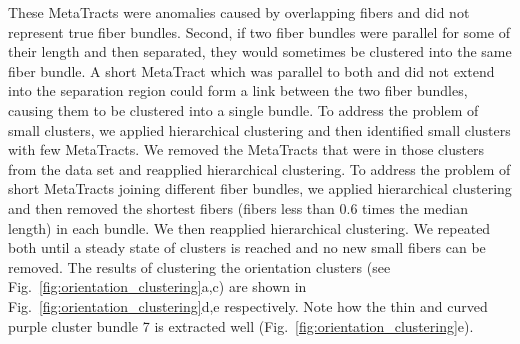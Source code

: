 These MetaTracts were anomalies caused by overlapping fibers and did not represent true fiber bundles.
Second, if two fiber bundles were parallel for some of their length and then separated, they would sometimes be clustered into the same fiber bundle.
A short MetaTract which was parallel to both and did not extend into the separation region could form a link between the two fiber bundles, causing them to be clustered into a single bundle.
To address the problem of small clusters, we applied hierarchical clustering and then identified small clusters with few MetaTracts.
We removed the MetaTracts that were in those clusters from the data set and reapplied hierarchical clustering.
To address the problem of short MetaTracts joining different fiber bundles, we applied hierarchical clustering and then removed the
shortest fibers (fibers less than 0.6 times the median length) in each bundle. We then reapplied hierarchical clustering.
We repeated both until a steady state of clusters is reached and no new small fibers can be removed. The results of clustering the orientation clusters (see Fig.~\ref{fig:orientation_clustering}a,c) are shown in Fig.~\ref{fig:orientation_clustering}d,e respectively. Note how the thin and curved purple cluster bundle 7 is extracted well (Fig.~\ref{fig:orientation_clustering}e). 


